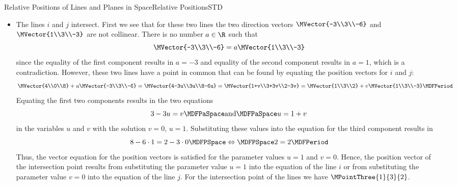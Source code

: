 \begin{MXContent}{Relative Positions of Lines and Planes in Space}{Relative Positions}{STD}
\begin{MExample}
\begin{itemize}
can result as a position vector of the line $h$:
\[
 \MVector{4\\0\\8}=\MVector{1\\-2\\7}+t\MVector{1\\-1\\2}=\MVector{1+t\\-2-t\\7+2t}\MDFPeriod
\]
In this vector equation, $t=3$ results from the first component and $t=-2$ from the second, which is 
a contradiction. Hence, the two lines do not have any points in common.
\item The lines $i$ and $j$ intersect. First we see that for these two lines the two direction vectors 
 $\MVector{-3\\3\\-6}$ and $\MVector{1\\3\\-3}$ are not collinear. There is no number $a\in\R$ such that
\[
 \MVector{-3\\3\\-6}=a\MVector{1\\3\\-3}
\]
since the equality of the first component results in $a=-3$ and equality of the second component 
results in $a=1$, which is a contradiction. However, these two lines have a point in common that can be 
found by equating the position vectors for $i$ and $j$:
\[
 \MVector{4\\0\\8}+u\MVector{-3\\3\\-6}=\MVector{4-3u\\3u\\8-6u}=\MVector{1+v\\3+3v\\2-3v}=\MVector{1\\3\\2}+v\MVector{1\\3\\-3}\MDFPeriod
\]
Equating the first two components results in the two equations 
\[
 3-3u=v\MDFPaSpace\textrm{and}\MDFPaSpace u=1+v
\]
in the variables $u$ and $v$ with the solution $v=0$, $u=1$. Substituting these values into the equation 
for the third component results in 
\[
 8-6\cdot 1=2-3\cdot 0\MDFPSpace\Leftrightarrow\MDFPSpace 2=2 \MDFPeriod
\]
Thus, the vector equation for the position vectors is satisfied for the parameter values $u=1$ and $v=0$.
Hence, the position vector of the intersection point results from substituting the parameter value $u=1$ into the equation 
of the line $i$ or from substituting the parameter value $v=0$ into the equation 
of the line $j$. For the intersection point of the lines we have $\MPointThree{1}{3}{2}$.


\end{itemize}
\end{MExample}
\end{MXContent}
